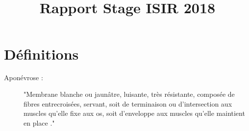 \documentclass{report}
\title{Rapport Stage ISIR 2018}
\begin{document}


\tableofcontents









\printbibliography

\appendix
    \chapter{Définitions}
    \label{Def}
    \begin{description}
    \item [Aponévrose : ] "Membrane blanche ou jaunâtre, luisante, très résistante, composée de fibres entrecroisées, servant, soit de terminaison ou d'intersection aux muscles qu'elle fixe aux os, soit d'enveloppe aux muscles qu'elle maintient en place
    ."\cite{noauthor_aponevrose_nodate}
    \end{description}
\end{document}

